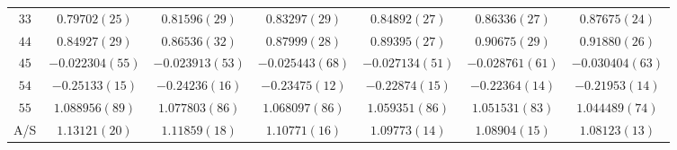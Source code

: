 \begin{table}
\begin{center}
\begin{tabular}{c|c c c c c c}
$33$ & $0.79702(25)$ & $0.81596(29)$ & $0.83297(29)$ & $0.84892(27)$ & $0.86336(27)$ & $0.87675(24)$ \\
$44$ & $0.84927(29)$ & $0.86536(32)$ & $0.87999(28)$ & $0.89395(27)$ & $0.90675(29)$ & $0.91880(26)$ \\
$45$ & $-0.022304(55)$ & $-0.023913(53)$ & $-0.025443(68)$ & $-0.027134(51)$ & $-0.028761(61)$ & $-0.030404(63)$ \\
$54$ & $-0.25133(15)$ & $-0.24236(16)$ & $-0.23475(12)$ & $-0.22874(15)$ & $-0.22364(14)$ & $-0.21953(14)$ \\
$55$ & $1.088956(89)$ & $1.077803(86)$ & $1.068097(86)$ & $1.059351(86)$ & $1.051531(83)$ & $1.044489(74)$ \\
\hline
A/S & $1.13121(20)$ & $1.11859(18)$ & $1.10771(16)$ & $1.09773(14)$ & $1.08904(15)$ & $1.08123(13)$ \\
\hline
\hline
\end{tabular}
\end{center}
\end{table}